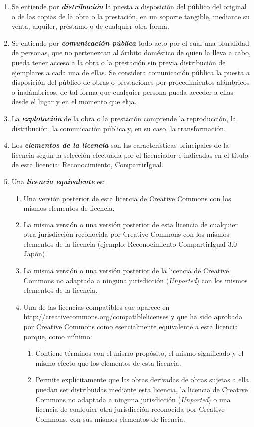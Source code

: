 \begin{enumerate}
	\item Se entiende por \textbf{\emph{distribución}} la puesta a disposición del público del original o de las copias de la obra o la prestación, en un soporte tangible, mediante su venta, alquiler, préstamo o de cualquier otra forma. 

     \item Se entiende por \textbf{\emph{comunicación pública}} todo acto por el cual una pluralidad de personas, que no pertenezcan al ámbito doméstico de quien la lleva a cabo,  pueda tener acceso a la obra o la prestación sin previa distribución de ejemplares a cada una de ellas. Se considera comunicación pública la puesta a disposición del público de obras o prestaciones por procedimientos alámbricos o inalámbricos, de tal forma que cualquier persona pueda acceder a ellas desde el lugar y en el momento que elija.

     \item La \textbf{\emph{explotación}} de la obra o la prestación comprende la reproducción, la distribución, la comunicación pública y, en su caso, la transformación.

     \item Los \textbf{\emph{elementos de la licencia}} son las características principales de la licencia según la selección efectuada por el licenciador e indicadas en el título de esta licencia: Reconocimiento, CompartirIgual.
\item Una \textbf{\emph{licencia equivalente}} es: 
	\begin{enumerate}
	\item Una versión posterior de esta licencia de Creative Commons con los mismos elementos de licencia.
	\item La misma versión o una versión posterior de esta licencia de cualquier otra jurisdicción reconocida por Creative Commons con los mismos elementos de la licencia (ejemplo: Reconocimiento-CompartirIgual 3.0 Japón).
        \item La misma versión o una versión posterior de la licencia de Creative Commons no adaptada a ninguna jurisdicción (\emph{Unported}) con los mismos elementos de la licencia.	
	\item Una de las licencias compatibles que aparece en http://creativecommons.org/compatiblelicenses y que ha sido aprobada por Creative Commons como esencialmente equivalente a esta licencia porque, como mínimo:
		\begin{enumerate}
	\item Contiene términos con el mismo propósito, el mismo significado y el mismo efecto que los elementos de esta licencia.
	\item Permite explícitamente que las obras derivadas de obras sujetas a ella puedan ser distribuidas mediante esta licencia, la licencia de Creative Commons no adaptada a ninguna jurisdicción (\emph{Unported}) o una licencia de cualquier otra jurisdicción reconocida por Creative Commons, con sus mismos elementos de licencia.
	        \end{enumerate}
	
        \end{enumerate}

\end{enumerate}

